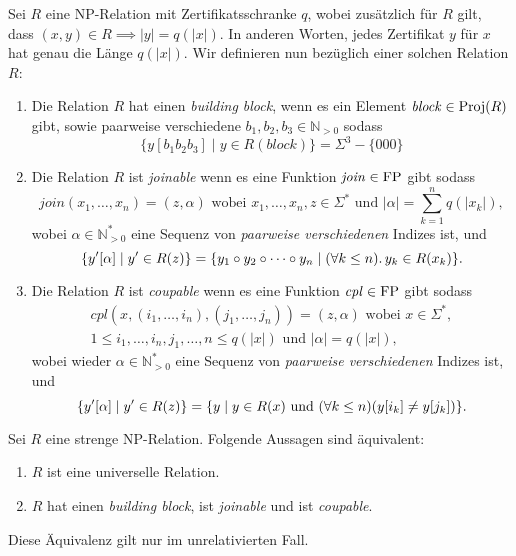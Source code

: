 \begin{definition}
    Sei $R$ eine NP-Relation mit Zertifikatsschranke $q$, wobei zusätzlich für $R$ gilt, dass $(x,y)\in R\implies |y|=q(|x|)$. In anderen Worten, jedes Zertifikat $y$ für $x$ hat genau die Länge $q(|x|)$.
    Wir definieren nun bezüglich einer solchen Relation $R$:
    \begin{enumerate}
        \item Die Relation $R$ hat einen \emph{building block}, wenn es ein Element $\mathit{block}\in\operatorname{Proj}(R)$ gibt, sowie paarweise verschiedene $b_1,b_2,b_3\in\mathbb N_{>0}$ sodass
            \[\{ y[b_1b_2b_3] \mid y\in R(\mathit{block}) \} = \Sigma^3 - \{000\} \]
        \item Die Relation $R$ ist \emph{joinable} wenn es eine Funktion $\mathit{join}\in \mathrm{FP}$ gibt sodass
            \[ \mathit{join}(x_1, \dots, x_n) = (z, \alpha) \text{ wobei } x_1, \ldots, x_n, z\in \Sigma^* \text{ und } |\alpha|=\sum_{k=1}^n q(|x_k|), \] 
            wobei $\alpha\in \mathbb N_{>0}^*$ eine Sequenz von \emph{paarweise verschiedenen} Indizes ist, und
            \begin{equation*} \{ y'[\alpha] \mid y' \in R(z)\} \\= \{ y_1\circ y_2 \circ \cdots \circ y_n \mid (\forall k\leq n).\, y_k \in R(x_k) \}. \end{equation*}
        \item Die Relation $R$ ist \emph{coupable} wenn es eine Funktion $\mathit{cpl}\in \mathrm{FP}$ gibt sodass
            \begin{multline*} \mathit{cpl}(x, (i_1, \ldots, i_n), (j_1, \ldots, j_n)) = (z, \alpha) \text{ wobei } x\in\Sigma^*,\\ 1\leq i_1, \ldots, i_n, j_1,\ldots, n \leq q(|x|) \text{ und } |\alpha|=q(|x|),\end{multline*}
            wobei wieder $\alpha\in \mathbb N_{>0}^*$ eine Sequenz von \emph{paarweise verschiedenen} Indizes ist, und
            \begin{equation*} \{ y'[\alpha] \mid y'\in R(z) \} \\= \{ y \mid y\in R(x) \text{ und } (\forall k\leq n)(y[i_k]\neq y[j_k]) \}. \end{equation*}
    \end{enumerate}
\end{definition}

\begin{theorem}
    Sei $R$ eine strenge NP-Relation.
    Folgende Aussagen sind äquivalent:
    \begin{enumerate}
        \item $R$ ist eine universelle Relation.
        \item $R$ hat einen \emph{building block}, ist \emph{joinable} und ist \emph{coupable}.
    \end{enumerate}
    Diese Äquivalenz gilt nur im unrelativierten Fall.
\end{theorem}

